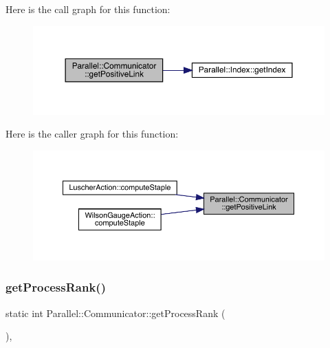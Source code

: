 Here is the call graph for this function\+:\nopagebreak
\begin{figure}[H]
\begin{center}
\leavevmode
\includegraphics[width=350pt]{class_parallel_1_1_communicator_ae715d67d2e60def9bf529702a64f4caa_cgraph}
\end{center}
\end{figure}
Here is the caller graph for this function\+:\nopagebreak
\begin{figure}[H]
\begin{center}
\leavevmode
\includegraphics[width=350pt]{class_parallel_1_1_communicator_ae715d67d2e60def9bf529702a64f4caa_icgraph}
\end{center}
\end{figure}
\mbox{\label{class_parallel_1_1_communicator_a474ab433da0e83ef372d74e26a7e5cb0}} 
\subsubsection{\texorpdfstring{getProcessRank()}{getProcessRank()}}
{\footnotesize\ttfamily static int Parallel\+::\+Communicator\+::get\+Process\+Rank (\begin{DoxyParamCaption}{ }\end{DoxyParamCaption})\hspace{0.3cm}{\ttfamily [inline]}, {\ttfamily [static]}}

